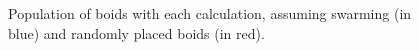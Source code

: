 \documentclass[
reprint,
showpacs,preprintnumbers,
amsmath,amssymb,
prl,
]{revtex4-1}
\begin{document}
\begin{figure}[!htp]
		\centering
		\label{fig:population}
				
	\caption{Population of boids with each calculation, assuming swarming (in blue) and randomly placed boids (in red).}
\end{figure}



	
	
\end{document}
